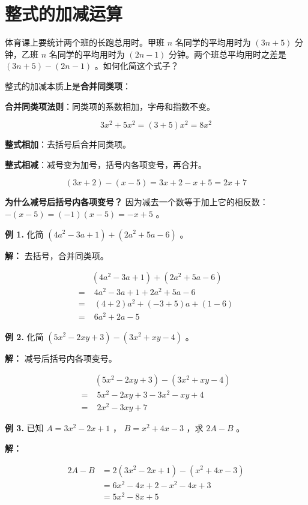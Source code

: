 \section*{整式的加减运算}


\begin{explore}


体育课上要统计两个班的长跑总用时。甲班 $n$ 名同学的平均用时为 $(3n + 5)$ 分钟，乙班 $n$ 名同学的平均用时为 $(2n - 1)$ 分钟。两个班总平均用时之差是 $(3n + 5) - (2n - 1)$ 。如何化简这个式子？

\end{explore}

\begin{understand}


整式的加减本质上是\textbf{合并同类项}：

\textbf{合并同类项法则}：同类项的系数相加，字母和指数不变。

\[
3x^2 + 5x^2 = (3 + 5)x^2 = 8x^2
\]


\textbf{整式相加}：去括号后合并同类项。

\textbf{整式相减}：减号变为加号，括号内各项变号，再合并。

\[
(3x + 2) - (x - 5) = 3x + 2 - x + 5 = 2x + 7
\]


\textbf{为什么减号后括号内各项变号？} 因为减去一个数等于加上它的相反数： $-(x - 5) = (-1)(x - 5) = -x + 5$ 。

\end{understand}

\begin{workedexamples}


\textbf{例 1.} 化简 $(4a^2 - 3a + 1) + (2a^2 + 5a - 6)$ 。

\textbf{解：} 去括号，合并同类项。

\[
\begin{aligned}
&(4a^2 - 3a + 1) + (2a^2 + 5a - 6) \\
= &\; 4a^2 - 3a + 1 + 2a^2 + 5a - 6 \\
= &\; (4 + 2)a^2 + (-3 + 5)a + (1 - 6) \\
= &\; 6a^2 + 2a - 5
\end{aligned}
\]


\textbf{例 2.} 化简 $(5x^2 - 2xy + 3) - (3x^2 + xy - 4)$ 。

\textbf{解：} 减号后括号内各项变号。

\[
\begin{aligned}
&(5x^2 - 2xy + 3) - (3x^2 + xy - 4) \\
= &\; 5x^2 - 2xy + 3 - 3x^2 - xy + 4 \\
= &\; 2x^2 - 3xy + 7
\end{aligned}
\]


\textbf{例 3.} 已知 $A = 3x^2 - 2x + 1$ ， $B = x^2 + 4x - 3$ ，求 $2A - B$ 。

\textbf{解：}

\[
\begin{aligned}
2A - B &= 2(3x^2 - 2x + 1) - (x^2 + 4x - 3) \\
&= 6x^2 - 4x + 2 - x^2 - 4x + 3 \\
&= 5x^2 - 8x + 5
\end{aligned}
\]


\end{workedexamples}

